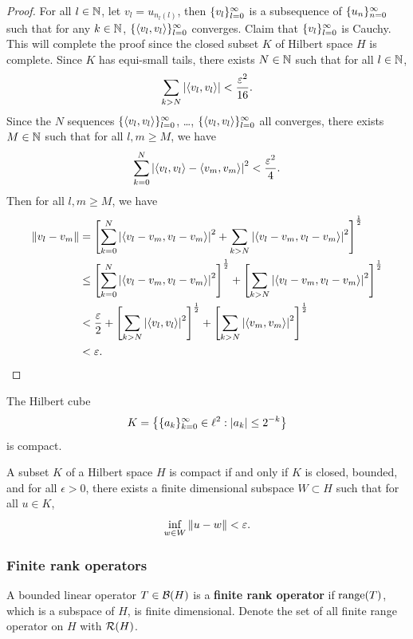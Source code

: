 \documentclass[a4paper]{article}
\renewcommand{\braket}[2]{\left\langle #1, #1 \right\rangle}
\begin{document}
\begin{proof}
For all $l \in \mathbb{N}$, let $v_l = u_{n_l(l)}$, then 
$\{ v_l \}_{l=0}^\infty$ is a subsequence of $\{ u_n \}_{n=0}^\infty$
such that for any $k \in \mathbb{N}$, 
$\seqinfl{\braket{v_l}{e_k}}$ converges. Claim that 
$\{ v_l \}_{l=0}^\infty$ is Cauchy. This will complete the proof 
since the closed subset $K$ of Hilbert space $H$ is complete.
Since $K$ has equi-small tails, there exists $N \in \mathbb{N}$
such that for all $l \in \mathbb{N}$, 
\[
\sum_{k > N} \abs{\braket{v_l}{e_k}} < \frac{\epsilon^2}{16}.
\]
Since the $N$ sequences $\seqinfl{\braket{v_l}{e_1}}$, 
\dots, $\seqinfl{\braket{v_l}{e_N}}$ all converges, 
there exists $M \in \mathbb{N}$ such that for all $l, m \geq M$, 
we have 
\[
\sum_{k=0}^N \abs{\braket{v_l}{e_k} - \braket{v_m}{e_k}}^2 
< \frac{\epsilon^2}{4}.
\]
Then for all $l, m \geq M$, we have 
\[
\begin{aligned}
  \norm{v_l - v_m} 
  &= 
  \left[ \sum_{k=0}^N \abs{\braket{v_l - v_m}{e_k}}^2 
  + \sum_{k > N} \abs{\braket{v_l - v_m}{e_k}}^2 \right]^{\frac{1}{2}} \\
  &\leq
  \left[ \sum_{k=0}^N \abs{\braket{v_l - v_m}{e_k}}^2  \right]
  ^{\frac{1}{2}}
  + \left[ \sum_{k > N} \abs{\braket{v_l - v_m}{e_k}}^2 \right]
  ^{\frac{1}{2}} \\ 
  &< \frac{\epsilon}{2} + \left[ \sum_{k > N} \abs{\braket{v_l}{e_m}}^2 \right]
  ^{\frac{1}{2}} + \left[ \sum_{k > N} \abs{\braket{v_m}{e_k}}^2 \right]
  ^{\frac{1}{2}} \\
  &< \epsilon. 
\end{aligned}
\]
\end{proof}

\begin{eg}
The Hilbert cube 
\[
K = \left\{ \{ a_k \}_{k=0}^\infty \in \ell^2 : \left\lvert a_k\right\rvert \leq 2^{-k} \right\}
\]
is compact.
\end{eg}

\begin{thm}
A subset $K$ of a Hilbert space $H$ is compact 
if and only if $K$ is closed, bounded, and for 
all $\epsilon > 0$, there exists a finite dimensional subspace 
$W \subset H$ such that for all $u \in K$, 
\[
\inf_{w \in W} \left\lVert u - w\right\rVert < \varepsilon.
\] 
\end{thm}

\subsubsection*{Finite rank operators}

\begin{defi}
A bounded linear operator $T \in \mathcal{B}(H)$ is a \textbf{finite 
rank operator} if $\operatorname{range}(T)$, which is a subspace of $H$,
is finite dimensional. Denote the set of all finite range 
operator on $H$ with $\mathcal{R} (H)$.
\end{defi}
\end{document}
